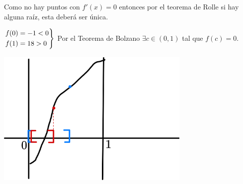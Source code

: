 \documentclass[12pt]{article}
\begin{document}
\begin{enumerate}[label=\color{red}\textbf{\arabic*}),leftmargin=*, start=27]
\begin{enumerate}[label=\color{red}\alph*), leftmargin=*]
\begin{minipage}[l]{0.5\textwidth}
            Como no hay puntos con $f'(x)=0$ entonces por el teorema de Rolle si hay alguna raíz, esta deberá ser única.
            
            $\begin{rcases}
                  f(0)=-1<0\\
                  f(1)=18>0
            \end{rcases}$ Por el Teorema de Bolzano $\exists c\in(0,1)$ tal que $f(c)=0$.
            
\begin{center}
      \includegraphics[width=0.7\textwidth]{Imágenes/119.png}
\end{center}


\end{minipage}
\end{enumerate}
\end{enumerate}
\end{document}
